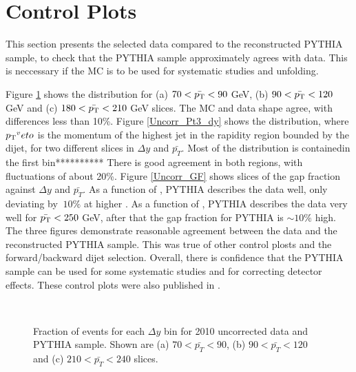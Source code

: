 \section{Control Plots}
\label{sec:GBJ1:Uncorr}
This section presents the selected data compared to the reconstructed PYTHIA sample, to check that the PYTHIA sample approximately agrees with data.
This is neccessary if the MC is to be used for systematic studies and unfolding.


Figure \ref{UncorrIncl_dy} shows the \Incl{} distribution for (a) $70<\mbox{$\bar{p_{\rm T}}$}{}<90$ GeV, (b) $90<\mbox{$\bar{p_{\rm T}}$}{}<120$ GeV and (c) $180<\mbox{$\bar{p_{\rm T}}$}{}<210$ GeV slices. 
The MC and data shape agree, with differences less than 10\%.
Figure \ref{Uncorr_Pt3_dy} shows the \ptDist{} distribution, where $\mbox{$p_{\rm T}$}{}^veto$ is the momentum of the highest jet in the rapidity region bounded by the dijet,  for two different slices in $\Delta y$ and $\bar{p_T}$. 
Most of the distribution is containedin the first bin**********
There is good agreement in both regions, with fluctuations of about 20\%.
Figure \ref{Uncorr_GF} shows slices of the gap fraction against $\Delta y$ and $\bar{p_T}$.
As a function of \dy{}, PYTHIA describes the data well, only deviating by $~10\%$ at higher \dy{}.
As a function of \ptb{}, PYTHIA describes the data very well for $\mbox{$\bar{p_{\rm T}}$}{}<250$ GeV, after that the gap fraction for PYTHIA is $\sim10\%$ high.
The three figures demonstrate reasonable agreement between the data and the reconstructed PYTHIA sample. 
This was true of other control plosts and the forward/backward dijet selection.
Overall, there is confidence that the PYTHIA sample can be used for some systematic studies and for correcting detector effects. 
These control plots were also published in \cite{ref:ATLASGap}.

\begin{figure}
\centering
\mbox{
              \quad
              \quad
}
\mbox{
              \quad
                              }
\caption[Comparison between data and PYTHIA sample in the inclusive distribution for $\Delta y$]{
Fraction of events for each $\Delta y$ bin for 2010 uncorrected data and PYTHIA sample. Shown are (a) $70<\bar{p_T}<90$, (b) $90<\bar{p_T}<120$ and (c) $210<\bar{p_T}<240$ slices.
\label{UncorrIncl_dy}}
\end{figure}

